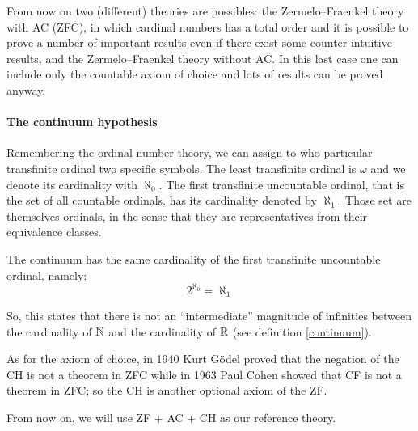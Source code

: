 From now on two (different) theories are possibles: the Zermelo--Fraenkel theory with AC (ZFC), in which cardinal numbers has a total order and it is possible to prove a number of important results even if there exist some counter-intuitive results, and the Zermelo--Fraenkel theory without AC. In this last case one can include only the countable axiom of choice and lots of results can be proved anyway.

\paragraph{The continuum hypothesis} Remembering the ordinal number theory, we can assign to who particular transfinite ordinal two specific symbols. 
The least transfinite ordinal is $\omega$ and we denote its cardinality with $\aleph_0$.
The first transfinite uncountable ordinal, that is the set of all countable ordinals, has its cardinality denoted by $\aleph_1$. Those set are themselves ordinals, in the sense that they are representatives from their equivalence classes.

\begin{defn} 
	The continuum has the same cardinality of the first transfinite uncountable ordinal, namely:
	$$ 2^{\aleph_0} = \aleph_1 $$
\end{defn}

So, this states that there is not an ``intermediate'' magnitude of infinities between the cardinality of $\mathbb N$ and the cardinality of $\mathbb R$ (see definition \vref{continuum}). 

As for the axiom of choice, in 1940 Kurt Gödel proved that the negation of the CH is not a theorem in ZFC while in 1963 Paul Cohen showed that CF is not a theorem in ZFC; so the CH is another optional axiom of the ZF.

From now on, we will use ZF + AC + CH as our reference theory.
